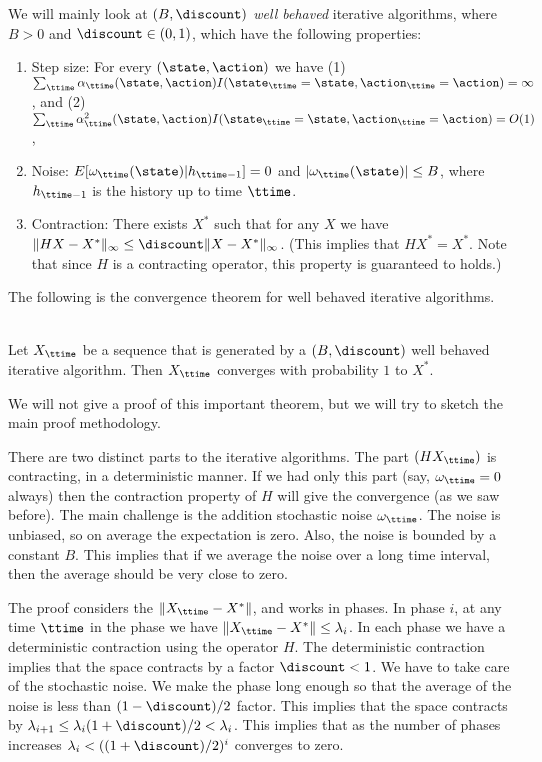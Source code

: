 We will mainly look at {\em $(B,\discount)$ well behaved} iterative
algorithms, where $B>0$ and $\discount\in(0,1)$, which have the
following properties:
\begin{enumerate}
\item Step size: For every $(\state,\action)$ we have (1) $\sum_\ttime
\alpha_\ttime(\state,\action)
I(\state_\ttime=\state,\action_\ttime=\action)=\infty $, and (2)
$\sum_\ttime \alpha_\ttime^2(\state,\action)
I(\state_\ttime=\state,\action_\ttime=\action)=O(1)$,
\item Noise: $E[\omega_\ttime(\state)|h_{\ttime-1}]=0$ and $|\omega_\ttime(\state)|\leq B$, where
$h_{\ttime-1}$ is the history up to time $\ttime$.
\item Contraction: There exists $X^*$ such that for any $X$ we have $\|HX-X^*\|_\infty
\leq \discount \|X-X^*\|_\infty$. (This implies that $HX^*=X^*$.
Note that since $H$ is a contracting operator, this property is
guaranteed to holds.)
\end{enumerate}

The following is the convergence theorem for well behaved iterative
algorithms.

\begin{theorem}\ \\
\label{thm:stoch-approx}
 Let $X_\ttime$ be a sequence that is generated by a
$(B,\discount)$ well behaved iterative algorithm. Then $X_\ttime$
converges with probability $1$ to $X^*$.
\end{theorem}

We will not give a proof of this important theorem, but we will try
to sketch the main proof methodology.

There are two distinct parts to the iterative algorithms. The part
$(HX_\ttime)$ is contracting, in a deterministic manner. If we had
only this part (say, $\omega_\ttime=0$ always) then the contraction
property of $H$ will give the convergence (as we saw before). The
main challenge is the addition stochastic noise $\omega_\ttime$. The
noise is unbiased, so on average the expectation is zero. Also, the
noise is bounded by a constant $B$. This implies that if we average
the noise over a long time interval, then the average should be very
close to zero.

The proof considers the $\|X_\ttime-X^*\|$, and  works in phases. In
phase $i$, at any time $\ttime$ in the phase we have
$\|X_\ttime-X^*\|\leq \lambda_i$.
%
In each phase we have a deterministic contraction using the operator
$H$. The deterministic contraction implies that
the space contracts by a factor $\discount<1$. We have to take care
of the stochastic noise. We make the phase long enough so that the
average of the noise is less than $(1-\discount)/2$ factor. This
implies that the space contracts by
$\lambda_{i+1}\leq\lambda_i(1+\discount)/2<\lambda_i $. This implies
that as the number of phases increases $\lambda_i<
((1+\discount)/2)^i$ converges to zero.

